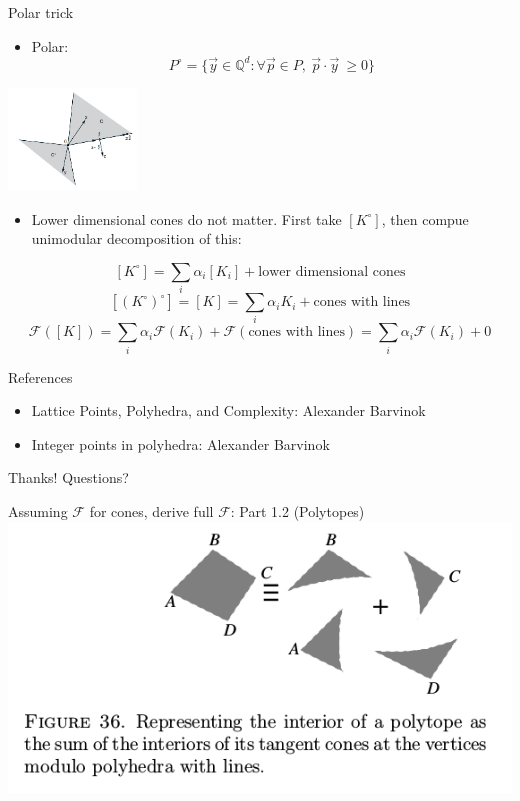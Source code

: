 \documentclass[8pt]{beamer}
\begin{document}
\begin{frame}[label=sec-15]{Polar trick}
\begin{itemize}
\item Polar: $$P^\circ = \Bigg\{ \vec y \in \mathbb{Q}^d :  \forall \vec p \in P, \  \vec p \cdot \vec y  \ \geq 0 \Bigg\}$$
\end{itemize}

\begin{center}
\includegraphics[width=3.40cm, keepaspectratio]{res/polar-of-cone.png}
\end{center}

\begin{itemize}
\item Lower dimensional cones do not matter. First take $[K^\circ]$, then compue unimodular decomposition of this:
\end{itemize}
$$[K^\circ] = \sum_i \alpha_i [K_i] + \text{lower dimensional cones}$$
$$[(K^\circ)^\circ] = [K] = \sum_i \alpha_i K_i + \text{cones with lines}$$
$$ \mathcal{F}([K]) = \sum_i \alpha_i \mathcal{F}(K_i) + \mathcal{F}(\text{cones with lines}) = \sum_i \alpha_i \mathcal{F}(K_i) + 0$$
\end{frame}



\begin{frame}[label=sec-16]{References}
\begin{itemize}
\item Lattice Points, Polyhedra, and Complexity: Alexander Barvinok
\item Integer points in polyhedra: Alexander Barvinok
\end{itemize}
\end{frame}


\begin{frame}[label=sec-17]{Thanks!}
Questions?
\end{frame}

\begin{frame}[label=sec-18]{Assuming $\mathcal{F}$ for cones, derive full $\mathcal{F}$: Part 1.2 (Polytopes)}
\includegraphics[width=.9\linewidth]{./res/polytope-as-sum-of-tangent-cones.png}
\end{frame}
\end{document}
